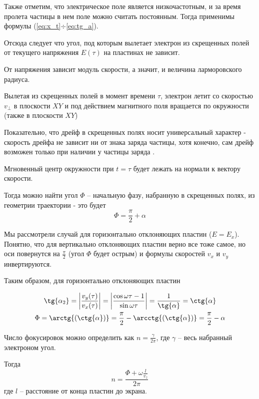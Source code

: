 Также отметим, что электрическое поле является низкочастотным, и за время пролета частицы в нем поле можно считать постоянным. Тогда применимы формулы (\ref{eq:x_t}$\div$\ref{eq:tg_a}).

Отсюда следует что угол, под которым вылетает электрон из скрещенных полей от текущего напряжения $E(\tau)$ на пластинах не зависит. 

От напряжения зависит модуль скорости, а значит, и величина ларморовского радиуса. 

Вылетая из скрещенных полей в момент времени $\tau$, электрон летит со скоростью $v_\perp$ в плоскости $XY$ и под действием магнитного поля вращается по окружности (также в плоскости $XY$)

Показательно, что дрейф в скрещенных полях носит универсальный характер - скорость дрейфа не зависит ни от знака заряда частицы, хотя конечно, сам дрейф возможен только при наличии у частицы заряда \cite{radantscev}.




Мгновенный центр окружности при $t=\tau$ будет лежать на нормали к вектору скорости.

Тогда можно найти угол $\Phi$ -- начальную фазу, набранную в скрещенных полях, из геометрии траектории - это будет $$\Phi=\frac{\pi}{2}+\alpha$$

Мы рассмотрели случай для горизонтально отклоняющих пластин ($E=E_x$). Понятно, что для вертикально отклоняющих пластин верно все тоже самое, но оси повернутся на $\frac{\pi}{2}$ (угол $\Phi$ будет острым) и формулы скоростей $v_x$ и $v_y$ инвертируются. 

Таким образом, для горизонтально отклоняющих пластин 

\begin{gather}
	\tg{\alpha_2}=\left|\frac{v_y(\tau)}{v_x(\tau)}\right|=\left|\frac{\cos\omega{\tau}-1}{\sin{\omega{\tau}}}\right|=\frac{1}{\tg{\alpha}}=\ctg{\alpha}\\
	\Phi=\arctg{(\ctg{\alpha})}=\frac{\pi}{2}-\arcctg{(\ctg{\alpha})}=\frac{\pi}{2}-\alpha
\end{gather}

Число фокусировок можно определить как $n=\frac{\gamma}{2\pi}$, где $\gamma$ -- весь набранный электроном угол.

Тогда
\begin{equation}
	n=\frac{\Phi+\omega\frac{l}{v_z}}{2\pi}
\end{equation}
где $l$ -- расстояние от конца пластин до экрана.



